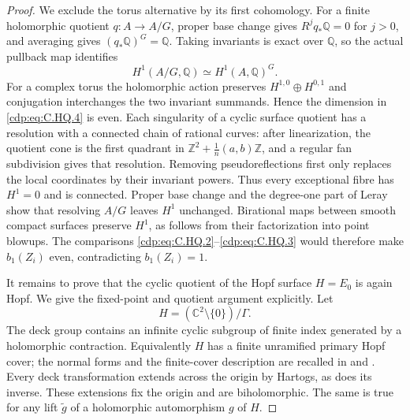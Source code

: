 \begin{proof}
We exclude the torus alternative by its first
cohomology. For a finite holomorphic quotient
$q:A\to A/G$, proper base change gives
$R^jq_*\mathbb Q=0$ for $j>0$, and averaging gives
$(q_*\mathbb Q)^G=\mathbb Q$. Taking invariants is
exact over $\mathbb Q$, so the actual pullback map
identifies
\[
                     H^1(A/G,\mathbb Q)
                          \simeq H^1(A,\mathbb Q)^G.
 \tag{C.HQ.4}\label{cdp:eq:C.HQ.4}
\]
For a complex torus the holomorphic action preserves
$H^{1,0}\oplus H^{0,1}$ and conjugation interchanges
the two invariant summands. Hence the dimension in
\eqref{cdp:eq:C.HQ.4} is even. Each singularity of a cyclic surface
quotient has a resolution with a connected chain
of rational curves: after linearization, the
quotient cone is the first quadrant in
$\mathbb Z^2+\frac1n(a,b)\mathbb Z$, and a regular
fan subdivision gives that resolution. Removing
pseudoreflections first only replaces the local
coordinates by their invariant powers. Thus every
exceptional fibre has $H^1=0$ and is connected.
Proper base change and the degree-one part of
Leray show that resolving $A/G$ leaves $H^1$
unchanged. Birational maps between smooth compact
surfaces preserve $H^1$, as follows from their
factorization into point blowups. The comparisons
\eqref{cdp:eq:C.HQ.2}--\eqref{cdp:eq:C.HQ.3} would therefore make $b_1(Z_i)$
even, contradicting $b_1(Z_i)=1$.

It remains to prove that the cyclic quotient of
the Hopf surface $H=E_0$ is again Hopf. We give
the fixed-point and quotient argument explicitly.
Let
\[
            H=(\mathbb C^2\setminus\{0\})/\Gamma.
 \tag{C.HQ.5}\label{cdp:eq:C.HQ.5}
\]
The deck group contains an infinite cyclic
subgroup of finite index generated by a
holomorphic contraction. Equivalently $H$ has
a finite unramified primary Hopf cover; the
normal forms and the finite-cover description
are recalled in \cite[\S1.1]{Nakamura2008VII}
and \cite[Theorem~2.1]{Khaled2024Hopf}.
Every deck transformation extends across the
origin by Hartogs, as does its inverse. These
extensions fix the origin and are biholomorphic.
The same is true for any lift $\widetilde g$
of a holomorphic automorphism $g$ of $H$.


\end{proof}
